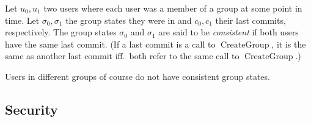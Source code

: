 \begin{definition} \label{def:consistent-group-state}
	Let $u_0, u_1$ two users where each user was a member of a group at some point in time. Let $\sigma_0, \sigma_1$ the group states they were in and $c_0, c_1$ their last commits, respectively. The group states $\sigma_0$ and $\sigma_1$ are said to be \emph{consistent} if both users have the same last commit. (If a last commit is a call to $\operatorname{CreateGroup}$, it is the same as another last commit iff.\ both refer to the same call to $\operatorname{CreateGroup}$.)
\end{definition}

Users in different groups of course do not have consistent group states.


\subsection{Security}


